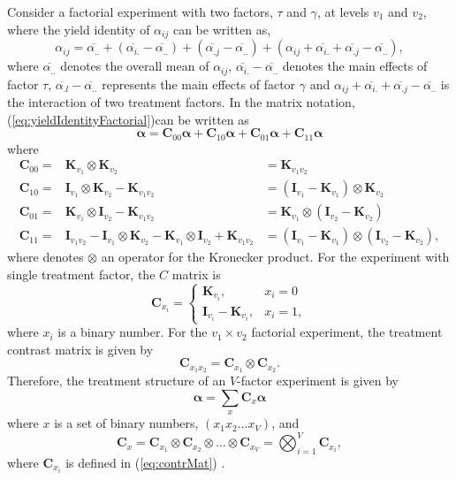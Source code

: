 \documentclass[article]{jss}
\newcommand{\I}{\mathbf{I}}
\newcommand{\K}{\mathbf{K}}
\newcommand{\C}{\mathbf{C}}
\begin{document}
Consider a factorial experiment with two factors, $\tau$ and $\gamma$, at levels $v_1$ and $v_2$, where the yield identity of $\alpha_{ij}$ can be written as,
\begin{equation}
\label{eq:yieldIdentityFactorial}
\alpha_{ij} = \overline{\alpha_{..}}+(\overline{\alpha_{i.}} -\overline{\alpha_{..}}) + (\overline{\alpha_{.j}} -\overline{\alpha_{..}}) +(\alpha_{ij} + \overline{\alpha_{i.}} + \overline{\alpha_{.j}} -\overline{\alpha_{..}}),
\end{equation}
where $\overline{\alpha_{..}}$ denotes the overall mean of $\alpha_{ij}$, $\overline{\alpha_{i.}} -\overline{\alpha_{..}}$ denotes the main effects of factor $\tau$, $\overline{\alpha_{.l}} -\overline{\alpha_{..}}$ represents the main effects of factor $\gamma$ and $\alpha_{ij} + \overline{\alpha_{i.}} + \overline{\alpha_{.j}} -\overline{\alpha_{..}}$ is the interaction of two treatment factors. In the matrix notation, (\ref{eq:yieldIdentityFactorial})can be written as
\[
\bm{\alpha} =  \C_{00} \bm{\alpha} +   \C_{10} \bm{\alpha} +   \C_{01} \bm{\alpha} +   \C_{11} \bm{\alpha} 
\]
where
\begin{eqnarray}
\nonumber \C_{00} = & \K_{v_1} \otimes \K_{v_2}& = \K_{v_1 v_2}\\
\nonumber \C_{10} = & \I_{v_1} \otimes \K_{v_2} - \K_{v_1 v_2}& = (\I_{v_1} - \K_{v_1}) \otimes \K_{v_2} \\
\nonumber \C_{01} = &\K_{v_1} \otimes \I_{v_2} - \K_{v_1 v_2}& =  \K_{v_1} \otimes (\I_{v_2} - \K_{v_2})\\
\nonumber \C_{11} = &\I_{v_1 v_2}-\I_{v_1} \otimes \K_{v_2} - \K_{v_1} \otimes \I_{v_2} + \K_{v_1 v_2} &= (\I_{v_1} - \K_{v_1}) \otimes (\I_{v_2} - \K_{v_2}),
\end{eqnarray}
where denotes $\otimes$ an operator for the Kronecker product. For the experiment with single treatment factor, the $C$ matrix is  
\begin{equation}
\label{eq:contrMat}
\C_{x_i} =
   \begin{cases}
       \K_{v_i}, & x_i = 0 \\
       \I_{v_i} - \K_{v_i}, & x_i = 1,
    \end{cases}
\end{equation}
where $x_i$ is a binary number. For the $v_1 \times v_2$ factorial experiment, the treatment contrast matrix is given by 
\[
\C_{x_1 x_2} = \C_{x_1} \otimes \C_{x_2}. 
\]
Therefore, the treatment structure of an $V$-factor experiment is given by 
\begin{equation}
\bm{\alpha} = \sum_x{\C_x\bm{\alpha}}
\end{equation}
where $x$ is a set of binary numbers, $(x_1 x_2 \dots x_{V})$, and 
\[
\C_x =  \C_{x_1} \otimes  \C_{x_2} \otimes \dots \otimes  \C_{x_{V}} = \bigotimes^{V} _{i = 1} \C_{x_i},
\]
where $\C_{x_i}$ is defined in (\ref{eq:contrMat}) \citep{John1987}.
\end{document}
